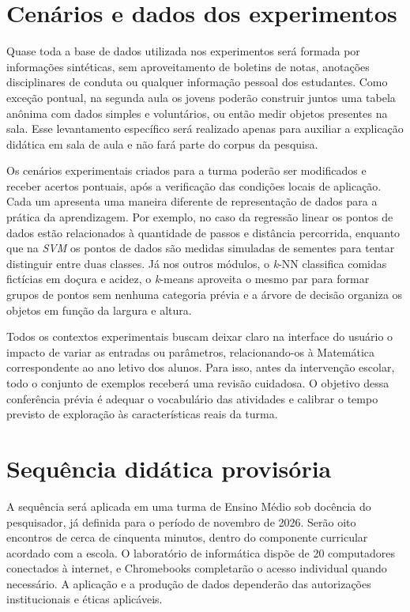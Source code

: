 \section{Cenários e dados dos experimentos}

Quase toda a base de dados utilizada nos experimentos será formada por informações sintéticas, sem aproveitamento de boletins de notas, anotações disciplinares de conduta ou qualquer informação pessoal dos estudantes. Como exceção pontual, na segunda aula os jovens poderão construir juntos uma tabela anônima com dados simples e voluntários, ou então medir objetos presentes na sala. Esse levantamento específico será realizado apenas para auxiliar a explicação didática em sala de aula e não fará parte do corpus da pesquisa.

Os cenários experimentais criados para a turma poderão ser modificados e receber acertos pontuais, após a verificação das condições locais de aplicação. Cada um apresenta uma maneira diferente de representação de dados para a prática da aprendizagem. Por exemplo, no caso da regressão linear os pontos de dados estão relacionados à quantidade de passos e distância percorrida, enquanto que na \textit{SVM} os pontos de dados são medidas simuladas de sementes para tentar distinguir entre duas classes. Já nos outros módulos, o \textit{k}-NN classifica comidas fictícias em doçura e acidez, o \textit{k}-means aproveita o mesmo par para formar grupos de pontos sem nenhuma categoria prévia e a árvore de decisão organiza os objetos em função da largura e altura.

Todos os contextos experimentais buscam deixar claro na interface do usuário o impacto de variar as entradas ou parâmetros, relacionando-os à Matemática correspondente ao ano letivo dos alunos. Para isso, antes da intervenção escolar, todo o conjunto de exemplos receberá uma revisão cuidadosa. O objetivo dessa conferência prévia é adequar o vocabulário das atividades e calibrar o tempo previsto de exploração às características reais da turma.

\section{Sequência didática provisória}

A sequência será aplicada em uma turma de Ensino Médio sob docência do pesquisador, já definida para o período de novembro de 2026. Serão oito encontros de cerca de cinquenta minutos, dentro do componente curricular acordado com a escola. O laboratório de informática dispõe de 20 computadores conectados à internet, e Chromebooks completarão o acesso individual quando necessário. A aplicação e a produção de dados dependerão das autorizações institucionais e éticas aplicáveis.


